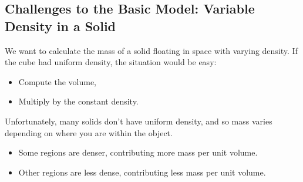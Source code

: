 \documentclass{ximera}
\begin{document}
\subsection*{Challenges to the Basic Model: Variable Density in a Solid}

We want to calculate the mass of a solid floating in space with varying density.
If the cube had uniform density, the situation would be easy:
\begin{itemize}
  \item Compute the volume,
  \item Multiply by the constant density.
\end{itemize}
Unfortunately, many solids don't have uniform density, and so mass varies depending on where you are within the object.
\begin{itemize}
  \item Some regions are denser, contributing more mass per unit volume.
  \item Other regions are less dense, contributing less mass per unit volume.
\end{itemize}
\end{document}
